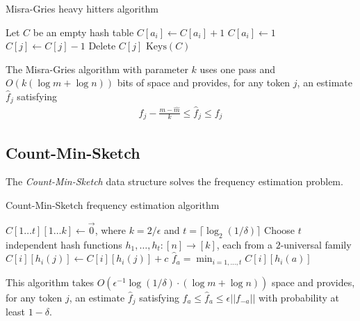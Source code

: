 \documentclass{article}
\begin{document}
\begin{algorithm}
  \caption{Misra-Gries heavy hitters algorithm}
  \begin{algorithmic}[1]
    \State Let $C$ be an empty hash table
    \State $C[a_i] \leftarrow C[a_i] + 1$
    \State $C[a_i] \leftarrow 1$
    \Else
    \State $C[j] \leftarrow C[j] - 1$
     \State Delete $C[j]$ \EndIf
    \EndFor
    \EndIf
    \EndFor
    \State \Return $\text{Keys}(C)$
    \EndProcedure
  \end{algorithmic}
\end{algorithm}

\begin{lemma}
  The Misra-Gries algorithm with parameter $k$ uses one pass and $O(k(\log m + \log n))$ bits of space and provides, for any token $j$, an estimate $\hat{f}_j$ satisfying
  \begin{align}
    f_j - \frac{m - \hat{m}}{k} \le \hat{f}_j \le f_j
  \end{align}
\end{lemma}

\subsection{Count-Min-Sketch}

The \emph{Count-Min-Sketch} data structure solves the frequency estimation problem.

\begin{algorithm}
  \caption{Count-Min-Sketch frequency estimation algorithm}
  \begin{algorithmic}[1]
    \Require $C[1 \ldots t][1 \ldots k] \leftarrow \vec{0}$, where $k = 2 / \epsilon$ and $t = \lceil{\log_2(1 / \delta)}\rceil$
    \Require Choose $t$ independent hash functions $h_1, \ldots, h_t \colon [n] \to [k]$, each from a $2$-universal family
    \State $C[i][h_i(j)] \leftarrow C[i][h_i(j)] + c$
    \EndFor
    \EndFor
    \EndProcedure
    \State \Return $\hat{f}_a = \min_{i = 1, \ldots, t} C[i][h_i(a)]$
    \EndProcedure
  \end{algorithmic}
\end{algorithm}

This algorithm takes $O(\epsilon^{-1} \log (1 / \delta) \cdot (\log m + \log n))$ space and provides, for any token $j$, an estimate $\hat{f}_j$ satisfying $f_a \leq \hat{f}_a \leq \epsilon || f_{-a} ||$ with probability at least $1 - \delta$.
\end{document}
